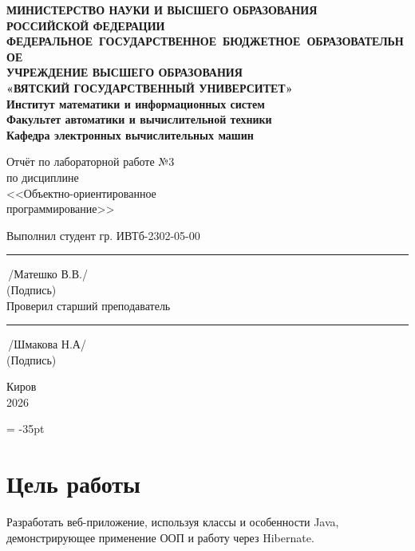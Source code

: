 \documentclass[11pt,a4paper]{article}
\begin{document}
\sloppy
\setlength{\footskip}{10mm}

\newpage\thispagestyle{plain}
\thispagestyle{empty}
\begin{center}
\textbf{МИНИСТЕРСТВО НАУКИ И ВЫСШЕГО ОБРАЗОВАНИЯ\\
РОССИЙСКОЙ ФЕДЕРАЦИИ\\[2ex]
\mbox{ФЕДЕРАЛЬНОЕ ГОСУДАРСТВЕННОЕ БЮДЖЕТНОЕ ОБРАЗОВАТЕЛЬНОЕ}\\
УЧРЕЖДЕНИЕ ВЫСШЕГО ОБРАЗОВАНИЯ\\
«ВЯТСКИЙ ГОСУДАРСТВЕННЫЙ УНИВЕРСИТЕТ»\\[2ex]
Институт математики и информационных систем\\[2ex]
Факультет автоматики и вычислительной техники\\[2ex]
Кафедра электронных вычислительных машин}
\end{center}
\vspace{40mm}

\begin{center}
Отчёт по лабораторной работе №3\\
по дисциплине\\[1ex]
<<Объектно-ориентированное \\программирование>>\\[1ex]
\end{center}
\vspace{54mm}
Выполнил студент гр. ИВТб-2302-05-00 \hspace{30mm} \rule[-0,5mm]{30mm}{0.15mm}\,/Матешко В.В./\\
\mbox{\tiny\hspace{112mm}(Подпись)}\\[2ex]
Проверил старший преподаватель \hspace{40mm} \rule[-0,5mm]{30mm}{0.15mm}\,/Шмакова Н.А/\\
\mbox{\tiny\hspace{112mm}(Подпись)}\\[2ex]
\vfill
\begin{center}
Киров\\
2026
\end{center}

\newpage
\topmargin = -35pt

\section*{\normalsize Цель работы}

Разработать веб-приложение, используя классы и особенности Java, демонстрирующее применение ООП и работу через Hibernate.
\end{document}
